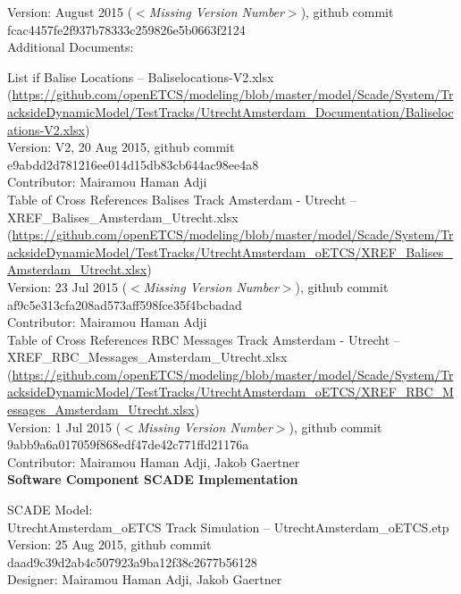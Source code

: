 \documentclass{article}
\newcommand{\tbi}[1]{$<$\textit{#1}$>$}
\begin{document}
Version: 
August 2015 (\tbi{Missing Version Number}), github commit fcac4457fe2f937b78333c259826e5b0663f2124
\\

Additional Documents:

List if Balise Locations -- Baliselocations-V2.xlsx\\
(\url{https://github.com/openETCS/modeling/blob/master/model/Scade/System/TracksideDynamicModel/TestTracks/UtrechtAmsterdam_Documentation/Baliselocations-V2.xlsx})\\
Version: V2, 20 Aug 2015, github commit e9abdd2d781216ee014d15db83cb644ac98ee4a8\\
Contributor: Mairamou Haman Adji\\


Table of Cross References Balises Track Amsterdam - Utrecht -- XREF\_Balises\_Amsterdam\_Utrecht.xlsx\\
(\url{https://github.com/openETCS/modeling/blob/master/model/Scade/System/TracksideDynamicModel/TestTracks/UtrechtAmsterdam_oETCS/XREF_Balises_Amsterdam_Utrecht.xlsx})\\
Version: 23 Jul 2015 (\tbi{Missing Version Number}), github commit af9c5e313cfa208ad573aff598fce35f4bcbadad\\
Contributor: Mairamou Haman Adji\\


Table of Cross References RBC Messages Track Amsterdam - Utrecht -- XREF\_RBC\_Messages\_Amsterdam\_Utrecht.xlsx\\
(\url{https://github.com/openETCS/modeling/blob/master/model/Scade/System/TracksideDynamicModel/TestTracks/UtrechtAmsterdam_oETCS/XREF_RBC_Messages_Amsterdam_Utrecht.xlsx})\\
 Version: 1 Jul 2015 (\tbi{Missing Version Number}), github commit 9abb9a6a017059f868edf47de42c771ffd21176a\\
 Contributor: Mairamou Haman Adji, Jakob Gaertner\\
 
 
\textbf{Software Component SCADE Implementation}

SCADE Model:\\

UtrechtAmsterdam\_oETCS Track Simulation -- UtrechtAmsterdam\_oETCS.etp\\
Version: 25 Aug 2015, github commit daad9c39d2ab4c507923a9ba12f38c2677b56128\\
Designer: Mairamou Haman Adji, Jakob Gaertner\\
\end{document}
